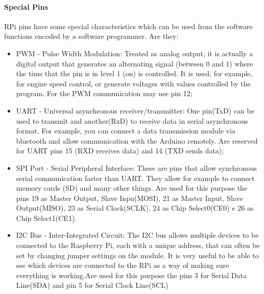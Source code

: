 \documentclass{acm_proc_article-sp}
\begin{document}
\paragraph{Special Pins}
RPi pins have some special characteristics which can be used from the software functions encoded by a software programmer. Are they:
\begin{itemize}

\item PWM - Pulse Width Modulation: Treated as analog output, it is actually a digital output that generates an alternating signal (between 0 and 1) where the time that the pin is in level 1 (on) is controlled. It is used, for example, for engine speed control, or generate voltages with values controlled by the program. For the PWM communication may use pin 12;

\item UART - Universal asynchronous receiver/transmitter: One pin(TxD) can be used to transmit and another(RxD) to receive data in serial asynchronous format. For example, you can connect a data transmission module via bluetooth and allow communication with the Arduino remotely. Are reserved for UART pins 15 (RXD receives data) and 14 (TXD sends data);%

\item SPI Port - Serial Peripheral Interface: These are pins that allow synchronous serial communication faster than UART. They allow for example to connect memory cards (SD) and many other things. Are used for this purpose the pins 19 as Master Output, Slave Inpu(MOSI), 21 as Master Input, Slave Output(MISO), 23 as Serial Clock(SCLK), 24 as Chip Select0(CE0) e 26 as Chip Select1(CE1).

\item I2C Bus - Inter-Integrated Circuit: The I2C bus allows multiple devices to be connected to the Raspberry Pi, each with a unique address, that can often be set by changing jumper settings on the module. It is very useful to be able to see which devices are connected to the RPi as a way of making sure everything is working.Are used for this purpose the pins 3 for Serial Data Line(SDA) and pin 5 for Serial Clock Line(SCL)
\end{itemize}
\end{document}
